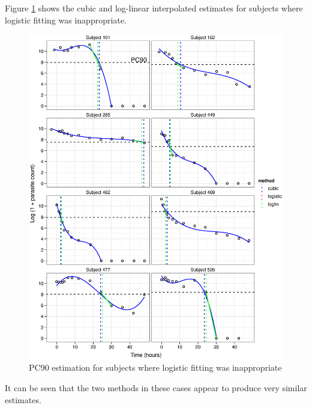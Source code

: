 Figure \ref{pc90-nofit} shows the cubic and log-linear interpolated estimates for subjects where logistic fitting was inappropriate.
\begin{figure}[p]
\includegraphics[width=150mm]{pc90-nofit.eps} 
\caption{PC90 estimation for subjects where logistic fitting was inappropriate}
\label{pc90-nofit}
\end{figure}
It can be seen that the two methods in these cases appear to produce very similar estimates.

